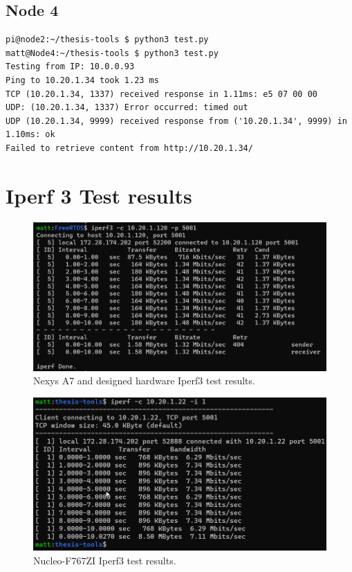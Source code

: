 \subsection*{Node 4}
\begin{lstlisting}[style=consoleoutput]pi@node2:~/thesis-tools $ python3 test.py
matt@Node4:~/thesis-tools $ python3 test.py
Testing from IP: 10.0.0.93
Ping to 10.20.1.34 took 1.23 ms
TCP (10.20.1.34, 1337) received response in 1.11ms: e5 07 00 00
UDP: (10.20.1.34, 1337) Error occurred: timed out
UDP (10.20.1.34, 9999) received response from ('10.20.1.34', 9999) in 1.10ms: ok
Failed to retrieve content from http://10.20.1.34/
\end{lstlisting}



\section{Iperf 3 Test results}
\label{app:iperf3_test_results}

\begin{figure}[h!]
    \centering
    \includegraphics[width=1\textwidth]{Images/iperf3Test1M3.png}
    \caption{Nexys A7 and designed hardware Iperf3 test results.}
\end{figure}

\begin{figure}[h!]
    \centering
    \includegraphics[width=1\textwidth]{Images/iperf2TestNucleo.png}
    \caption{Nucleo-F767ZI Iperf3 test results.}
\end{figure}

